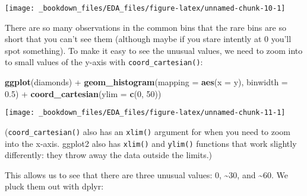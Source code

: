 \documentclass[]{book}
\newenvironment{Shaded}{\begin{snugshade}}{\end{snugshade}}
\newcommand{\KeywordTok}[1]{\textcolor[rgb]{0.13,0.29,0.53}{\textbf{{#1}}}}
\newcommand{\DataTypeTok}[1]{\textcolor[rgb]{0.13,0.29,0.53}{{#1}}}
\newcommand{\DecValTok}[1]{\textcolor[rgb]{0.00,0.00,0.81}{{#1}}}
\newcommand{\FloatTok}[1]{\textcolor[rgb]{0.00,0.00,0.81}{{#1}}}
\newcommand{\StringTok}[1]{\textcolor[rgb]{0.31,0.60,0.02}{{#1}}}
\newcommand{\NormalTok}[1]{{#1}}
\begin{document}
\begin{center}\texttt{[image: \_bookdown\_files/EDA\_files/figure-latex/unnamed-chunk-10-1]} \end{center}

There are so many observations in the common bins that the rare bins are
so short that you can't see them (although maybe if you stare intently
at 0 you'll spot something). To make it easy to see the unusual values,
we need to zoom into to small values of the y-axis with
\texttt{coord\_cartesian()}:

\begin{Shaded}
\begin{Highlighting}[]
\KeywordTok{ggplot}\NormalTok{(diamonds) +}\StringTok{ }
\StringTok{  }\KeywordTok{geom_histogram}\NormalTok{(}\DataTypeTok{mapping =} \KeywordTok{aes}\NormalTok{(}\DataTypeTok{x =} \NormalTok{y), }\DataTypeTok{binwidth =} \FloatTok{0.5}\NormalTok{) +}
\StringTok{  }\KeywordTok{coord_cartesian}\NormalTok{(}\DataTypeTok{ylim =} \KeywordTok{c}\NormalTok{(}\DecValTok{0}\NormalTok{, }\DecValTok{50}\NormalTok{))}
\end{Highlighting}
\end{Shaded}

\begin{center}\texttt{[image: \_bookdown\_files/EDA\_files/figure-latex/unnamed-chunk-11-1]} \end{center}

(\texttt{coord\_cartesian()} also has an \texttt{xlim()} argument for
when you need to zoom into the x-axis. ggplot2 also has \texttt{xlim()}
and \texttt{ylim()} functions that work slightly differently: they throw
away the data outside the limits.)

This allows us to see that there are three unusual values: 0,
\textasciitilde{}30, and \textasciitilde{}60. We pluck them out with
dplyr:
\end{document}
